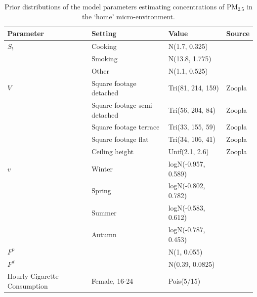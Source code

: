 \documentclass{article}
\begin{document}
\begin{appendix}
\begin{table}[H]
	\footnotesize
	\centering
	\caption{Prior distributions of the model parameters estimating concentrations of PM$_{2.5}$ in the `home' micro-environment.}
	\begin{tabular}{l l l l}
		\hline \hline 
		Parameter & Setting & Value & Source \\
		\hline 
		$S_t$                       & Cooking                      & N(1.7, 0.325)       & \citet{ozkaynak1996personal} \\
		                             & Smoking                      & N(13.8, 1.775)      & \citet{ozkaynak1996personal} \\
		                             & Other                        & N(1.1, 0.525)       & \citet{ozkaynak1996personal} \\
		$V$                          & Square footage detached      & Tri(81, 214, 159)   & Zoopla \\
		                             & Square footage semi-detached & Tri(56, 204, 84)    & Zoopla \\
		                             & Square footage terrace       & Tri(33, 155, 59)    & Zoopla \\
		                             & Square footage flat          & Tri(34, 106, 41)    & Zoopla \\
		                             & Ceiling height               & Unif(2.1, 2.6)      & Zoopla \\
		$v$                          & Winter                       & logN(-0.957, 0.589) & \citet{murray1995residential} \\
		                             & Spring                       & logN(-0.802, 0.782) & \citet{murray1995residential} \\
		                             & Summer                       & logN(-0.583, 0.612) & \citet{murray1995residential} \\
		                             & Autumn                       & logN(-0.787, 0.453) & \citet{murray1995residential} \\
		$F^p$                        &                              & N(1, 0.055)         &  \citet{burke2001population}\\
		$F^d$                        &                              & N(0.39, 0.0825)     &  \citet{burke2001population}\\
		Hourly Cigarette Consumption & Female, 16-24                & Pois(5/15)          & \citet{ONS2020} \\

\end{tabular}
\end{table}
\end{appendix}
\end{document}
